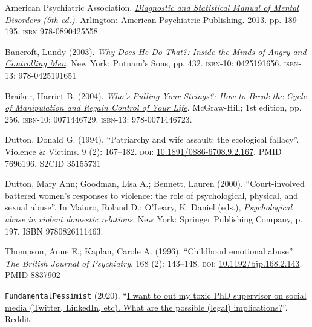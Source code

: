 \documentclass[12pt]{article}
\numberwithin{equation}{section}
\begin{document}
\begin{thebibliography}{99}
     American Psychiatric Association. \textit{\href{https://archive.org/details/diagnosticstatis0005unse/page/189}{Diagnostic and Statistical Manual of Mental Disorders (5th ed.)}}. Arlington: American Psychiatric Publishing. 2013. pp. 189--195. \textsc{isbn} 978-0890425558.
    
     Bancroft, Lundy (2003). \href{https://www.amazon.com/Why-Does-He-That-Controlling/dp/0425191656}{\textit{Why Does He Do That?: Inside the Minds of Angry and Controlling Men}}. New York: Putnam's Sons, pp. 432. \textsc{isbn-10}: 0425191656. \textsc{isbn-13}: 978-0425191651
    
     Braiker, Harriet B. (2004). \href{https://www.amazon.com/Whos-Pulling-Your-Strings-Manipulation/dp/0071446729}{\textit{Who's Pulling Your Strings?: How to Break the Cycle of Manipulation and Regain Control of Your Life}}. McGraw-Hill; 1st edition, pp. 256.  \textsc{isbn-10}: 0071446729. \textsc{isbn-13}: 978-0071446723.
    
     Dutton, Donald G. (1994). ``Patriarchy and wife assault: the ecological fallacy''. Violence \& Victims. 9 (2): 167–182. \textsc{doi}: \href{https://doi.org/10.1891%2F0886-6708.9.2.167}{10.1891/0886-6708.9.2.167}. PMID 7696196. S2CID 35155731
    
     Dutton, Mary Ann; Goodman, Lisa A.; Bennett, Lauren (2000). ``Court-involved battered women's responses to violence: the role of psychological, physical, and sexual abuse''. In Maiuro, Roland D.; O'Leary, K. Daniel (eds.), \textit{Psychological abuse in violent domestic relations}, New York: Springer Publishing Company, p. 197, ISBN 9780826111463.
    
      Thompson, Anne E.; Kaplan, Carole A. (1996). ``Childhood emotional abuse''. \textit{The British Journal of Psychiatry}. 168 (2): 143--148. \textsc{doi}: \href{https://doi.org/10.1192%2Fbjp.168.2.143}{10.1192/bjp.168.2.143}. PMID 8837902
    
     \texttt{FundamentalPessimist} (2020). ``\href{https://www.reddit.com/r/AskAcademia/comments/fyffwg/i_want_to_out_my_toxic_phd_supervisor_on_social/}{I want to out my toxic PhD supervisor on social media (Twitter, LinkedIn, etc). What are the possible (legal) implications?}''. Reddit.
    

\end{thebibliography}
\end{document}
